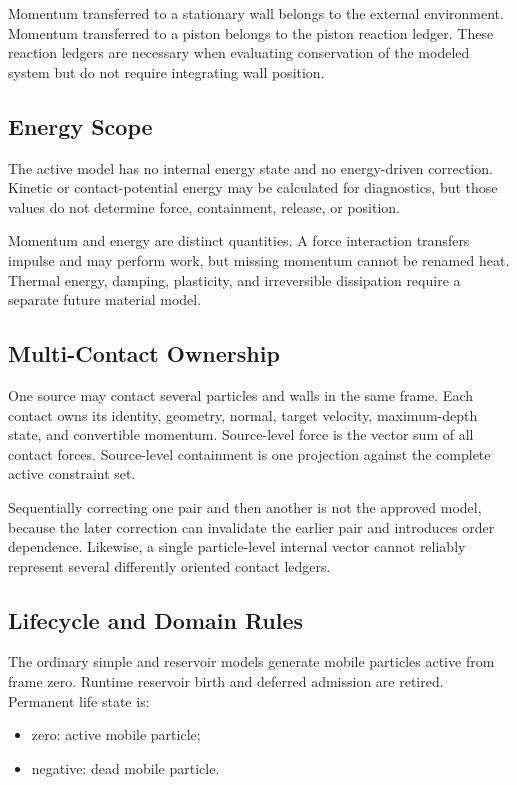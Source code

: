 Momentum transferred to a stationary wall belongs to the external
environment.  Momentum transferred to a piston belongs to the piston reaction
ledger.  These reaction ledgers are necessary when evaluating conservation of
the modeled system but do not require integrating wall position.

\subsection{Energy Scope}

The active model has no internal energy state and no energy-driven correction.
Kinetic or contact-potential energy may be calculated for diagnostics, but
those values do not determine force, containment, release, or position.

Momentum and energy are distinct quantities.  A force interaction transfers
impulse and may perform work, but missing momentum cannot be renamed heat.
Thermal energy, damping, plasticity, and irreversible dissipation require a
separate future material model.

\subsection{Multi-Contact Ownership}

One source may contact several particles and walls in the same frame.  Each
contact owns its identity, geometry, normal, target velocity, maximum-depth
state, and convertible momentum.  Source-level force is the vector sum of all
contact forces.  Source-level containment is one projection against the
complete active constraint set.

Sequentially correcting one pair and then another is not the approved model,
because the later correction can invalidate the earlier pair and introduces
order dependence.  Likewise, a single particle-level internal vector cannot
reliably represent several differently oriented contact ledgers.

\subsection{Lifecycle and Domain Rules}

The ordinary simple and reservoir models generate mobile particles active
from frame zero.  Runtime reservoir birth and deferred admission are retired.
Permanent life state is:

\begin{itemize}
    \item zero: active mobile particle;
    \item negative: dead mobile particle.
\end{itemize}

